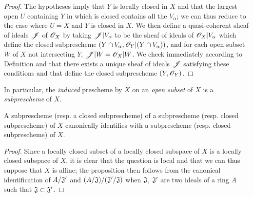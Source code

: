 \begin{proof}
\label{proof-1.4.1.5}
The hypotheses imply that $Y$ is locally closed in $X$ and that the largest open $U$
containing $Y$ in which is closed contains all the $V_\alpha$; we can thus reduce to the case
where $U=X$ and $Y$ is closed in $X$. We then define a quasi-coherent sheaf of ideals
$\mathscr{J}$ of $\mathscr{O}_X$ by taking $\mathscr{J}|V_\alpha$ to be the sheaf of ideals of $\mathscr{O}_X|V_\alpha$
which define the closed subprescheme $(Y\cap V_\alpha,\mathscr{O}_Y|(Y\cap V_\alpha))$, and for each
open subset $W$ of $X$ not intersecting $Y$, $\mathscr{J}|W=\mathscr{O}_X|W$. We check immediately
according to Definition  and 
that there exists a unique sheaf of ideals $\mathscr{J}$ satisfying these conditions and that
define the closed subprescheme $(Y,\mathscr{O}_Y)$.
\end{proof}

In particular, the {\em induced} prescheme by $X$ on an {\em open subset} of $X$ is a
{\em subprescheme} of $X$.

\begin{prop}[4.1.6]
\label{1.4.1.6}
A subprescheme (resp. a closed subprescheme) of a subprescheme
(resp. closed subprescheme) of $X$ canonically identifies with a subprescheme
(resp. closed subprescheme) of $X$.
\end{prop}

\begin{proof}
\label{proof-1.4.1.6}
Since a locally closed subset of a locally closed subspace of $X$ is a locally closed
subspace of $X$, it is clear  that the question is local
and that we can thus suppose that $X$ is affine; the proposition then follows from the
canonical identification of $A/\mathfrak{J}'$ and
$(A/\mathfrak{J})/(\mathfrak{J}'/\mathfrak{J})$ when $\mathfrak{J}$, $\mathfrak{J}'$ are
two ideals of a ring $A$ such that $\mathfrak{J}\subset\mathfrak{J}'$.
\end{proof}


